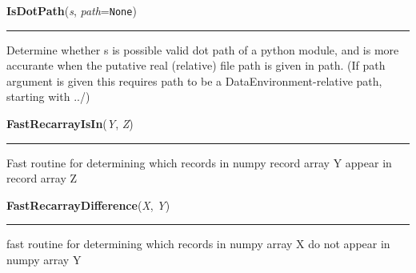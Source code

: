     \label{System:Utils:IsDotPath}

    \vspace{0.5ex}

\hspace{.8\funcindent}\begin{boxedminipage}{\funcwidth}

    \raggedright \textbf{IsDotPath}(\textit{s}, \textit{path}={\tt None})

    \vspace{-1.5ex}

    \rule{\textwidth}{0.5\fboxrule}
\setlength{\parskip}{2ex}
    Determine whether s is possible valid dot path of a python module, and 
    is more accurante when the putative real (relative) file path is given 
    in path.   (If path argument is given this requires path to be a 
    DataEnvironment-relative path, starting with ../)

\setlength{\parskip}{1ex}
    \end{boxedminipage}

    \label{System:Utils:FastRecarrayIsIn}

    \vspace{0.5ex}

\hspace{.8\funcindent}\begin{boxedminipage}{\funcwidth}

    \raggedright \textbf{FastRecarrayIsIn}(\textit{Y}, \textit{Z})

    \vspace{-1.5ex}

    \rule{\textwidth}{0.5\fboxrule}
\setlength{\parskip}{2ex}
    Fast routine for determining which records in numpy record array Y 
    appear in record array Z

\setlength{\parskip}{1ex}
    \end{boxedminipage}

    \label{System:Utils:FastRecarrayDifference}

    \vspace{0.5ex}

\hspace{.8\funcindent}\begin{boxedminipage}{\funcwidth}

    \raggedright \textbf{FastRecarrayDifference}(\textit{X}, \textit{Y})

    \vspace{-1.5ex}

    \rule{\textwidth}{0.5\fboxrule}
\setlength{\parskip}{2ex}
    fast routine for determining which records in numpy array X do not 
    appear in numpy array Y

\setlength{\parskip}{1ex}
    \end{boxedminipage}

